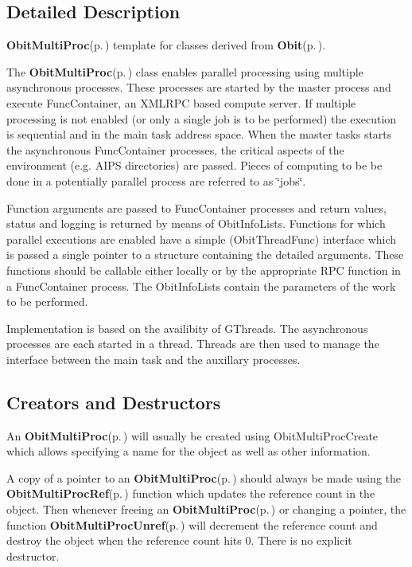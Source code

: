 \subsection{Detailed Description}
{\bf Obit\-Multi\-Proc}{\rm (p.\,\pageref{structObitMultiProc})} template for classes derived from {\bf Obit}{\rm (p.\,\pageref{structObit})}. 

The {\bf Obit\-Multi\-Proc}{\rm (p.\,\pageref{structObitMultiProc})} class enables parallel processing using multiple asynchronous processes. These processes are started by the master process and execute Func\-Container, an XMLRPC based compute server. If multiple processing is not enabled (or only a single job is to be performed) the execution is sequential and in the main task address space. When the master tasks starts the asynchronous Func\-Container processes, the critical aspects of the environment (e.g. AIPS directories) are passed. Pieces of computing to be be done in a potentially parallel process are referred to as \char`\"{}jobs\char`\"{}.

Function arguments are passed to Func\-Container processes and return values, status and logging is returned by means of Obit\-Info\-Lists. Functions for which parallel executions are enabled have a simple (Obit\-Thread\-Func) interface which is passed a single pointer to a structure containing the detailed arguments. These functions should be callable either locally or by the appropriate RPC function in a Func\-Container process. The Obit\-Info\-Lists contain the parameters of the work to be performed.

Implementation is based on the availibity of GThreads. The asynchronous processes are each started in a thread. Threads are then used to manage the interface between the main task and the auxillary processes.\subsection{Creators and Destructors}\label{ObitMultiProc_8h_ObitMultiProcaccess}
An {\bf Obit\-Multi\-Proc}{\rm (p.\,\pageref{structObitMultiProc})} will usually be created using Obit\-Multi\-Proc\-Create which allows specifying a name for the object as well as other information.

A copy of a pointer to an {\bf Obit\-Multi\-Proc}{\rm (p.\,\pageref{structObitMultiProc})} should always be made using the {\bf Obit\-Multi\-Proc\-Ref}{\rm (p.\,\pageref{ObitMultiProc_8h_a1})} function which updates the reference count in the object. Then whenever freeing an {\bf Obit\-Multi\-Proc}{\rm (p.\,\pageref{structObitMultiProc})} or changing a pointer, the function {\bf Obit\-Multi\-Proc\-Unref}{\rm (p.\,\pageref{ObitMultiProc_8h_a0})} will decrement the reference count and destroy the object when the reference count hits 0. There is no explicit destructor.

